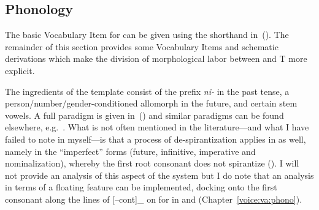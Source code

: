 	
	\subsection{Phonology} \label{vz:vz:phono}
The basic Vocabulary Item for {\vz} can be given using the shorthand in~(\nextx). The remainder of this section provides some Vocabulary Items and schematic derivations which make the division of morphological labor between {\vz} and T more explicit.
\ex {\vz} \lra~{\tnif}
\xe

\label{r1:3:3}The ingredients of the template \emph{\tnif} consist of the prefix \emph{ni-} in the past tense, a person/number/gender-conditioned allomorph in the future, and certain stem vowels. A full paradigm is given in~(\nextx) and similar paradigms can be found elsewhere, e.g.~\cite{schwarzwald08}. What is not often mentioned in the literature---and what I have failed to note in \cite{kastner18nllt} myself---is that a process of de-spirantization applies in {\tnif} as well, namely in the ``imperfect'' forms (future, infinitive, imperative and nominalization), whereby the first root consonant does not spirantize (). I will not provide an analysis of this aspect of the system but I do note that an analysis in terms of a floating feature can be implemented, docking onto the first consonant along the lines of [--cont]_{} on  for {\va} in {\tpie} and {\thit} (Chapter~\ref{voice:va:phono}).

\ex
{}
\xe

